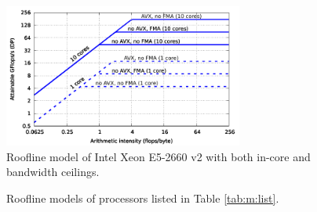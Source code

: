 \begin{figure}[ht]
   \centering
   \includegraphics[width=0.7\textwidth,clip=true]{images/roofline/roofline_emmy_Xeon2660v2_all-ceilings.pdf}
   \caption{Roofline model of Intel Xeon E5-2660 v2 with both in-core and bandwidth ceilings.}
  \label{fig:roofline_emmy_all-ceilings}
\end{figure}

\begin{figure}%
  \centering%
  \caption{Roofline models of processors listed in Table \ref{tab:m:list}.}%
  \label{fig:rooflines}
\end{figure}

